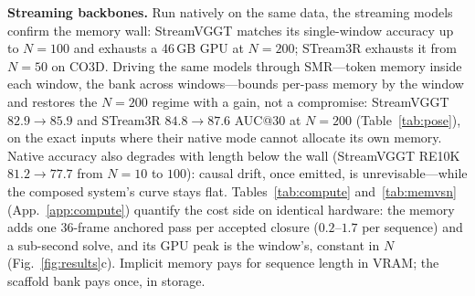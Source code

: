 \documentclass{article}
\newcommand{\smr}{\textsc{SMR}}
\begin{document}
\textbf{Streaming backbones.} Run natively on the same data, the streaming
models confirm the memory wall: StreamVGGT matches its single-window accuracy
up to $N{=}100$ and exhausts a 46\,GB GPU at $N{=}200$; STream3R exhausts it
from $N{=}50$ on CO3D. Driving the same models through \smr{}---token memory
inside each window, the bank across windows---bounds per-pass memory by the
window and restores the $N{=}200$ regime with a gain, not a compromise:
StreamVGGT $82.9\!\to\!85.9$ and STream3R $84.8\!\to\!87.6$ AUC@30 at
$N{=}200$ (Table~\ref{tab:pose}), on the exact inputs where their native
mode cannot allocate its own memory. Native accuracy also degrades with
length below the wall (StreamVGGT RE10K $81.2\!\to\!77.7$ from $N{=}10$ to
$100$): causal drift, once emitted, is unrevisable---while the composed
system's curve stays flat. Tables~\ref{tab:compute} and~\ref{tab:memvsn}
(App.~\ref{app:compute}) quantify the cost side on identical hardware: the
memory adds one $36$-frame anchored pass per accepted closure
($0.2$--$1.7$ per sequence) and a sub-second solve, and its GPU peak is the
window's, constant in $N$ (Fig.~\ref{fig:results}c). Implicit memory pays
for sequence length in VRAM; the scaffold bank pays once, in storage.
\end{document}
